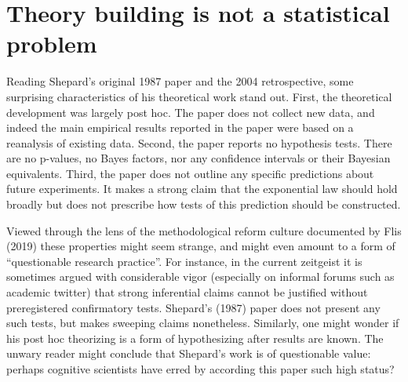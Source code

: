 \documentclass[
  english,
  doc]{apa6}
\begin{document}
\hypertarget{theory-building-is-not-a-statistical-problem}{%
\section{Theory building is not a statistical problem}\label{theory-building-is-not-a-statistical-problem}}

\noindent
Reading Shepard's original 1987 paper and the 2004 retrospective, some surprising characteristics of his theoretical work stand out. First, the theoretical development was largely post hoc. The paper does not collect new data, and indeed the main empirical results reported in the paper were based on a reanalysis of existing data. Second, the paper reports no hypothesis tests. There are no p-values, no Bayes factors, nor any confidence intervals or their Bayesian equivalents. Third, the paper does not outline any specific predictions about future experiments. It makes a strong claim that the exponential law should hold broadly but does not prescribe how tests of this prediction should be constructed.

Viewed through the lens of the methodological reform culture documented by Flis (2019) these properties might seem strange, and might even amount to a form of \enquote{questionable research practice}. For instance, in the current zeitgeist it is sometimes argued with considerable vigor (especially on informal forums such as academic twitter) that strong inferential claims cannot be justified without preregistered confirmatory tests. Shepard's (1987) paper does not present any such tests, but makes sweeping claims nonetheless. Similarly, one might wonder if his post hoc theorizing is a form of hypothesizing after results are known. The unwary reader might conclude that Shepard's work is of questionable value: perhaps cognitive scientists have erred by according this paper such high status?
\end{document}
